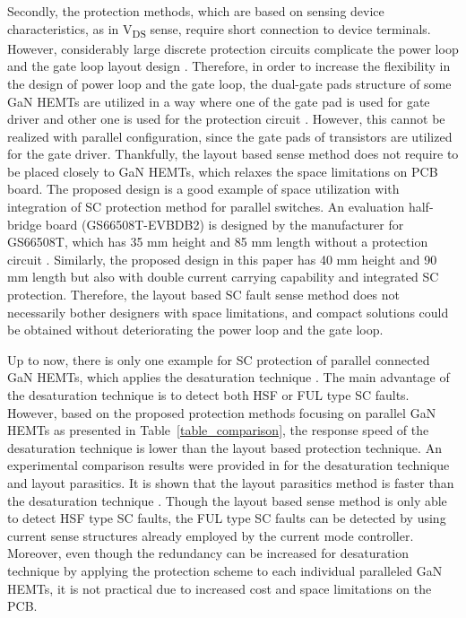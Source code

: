 \documentclass[journal]{IEEEtran}
\begin{document}
Secondly, the protection methods, which are based on sensing device characteristics, as in V\textsubscript{DS} sense, require short connection to device terminals. However, considerably large discrete protection circuits complicate the power loop and the gate loop layout design \cite{Hou2019}. Therefore, in order to increase the flexibility in the design of power loop and the gate loop, the dual-gate pads structure of some GaN HEMTs are utilized in a way where one of the gate pad is used for gate driver and other one is used for the protection circuit \cite{Hou2019}. However, this cannot be realized with parallel configuration, since the gate pads of transistors are utilized for the gate driver. Thankfully, the layout based sense method does not require to be placed closely to GaN HEMTs, which relaxes the space limitations on PCB board. The proposed design is a good example of space utilization with integration of SC protection method for parallel switches. An evaluation half-bridge board (GS66508T-EVBDB2) is designed by the manufacturer for GS66508T, which has 35 mm height and 85 mm length without a protection circuit \cite{GaNSystemsInc.2020}. Similarly, the proposed design in this paper has 40 mm height and 90 mm length but also with double current carrying capability and integrated SC protection. Therefore, the layout based SC fault sense method does not necessarily bother designers with space limitations, and compact solutions could be obtained without deteriorating the power loop and the gate loop.

Up to now, there is only one example for SC protection of parallel connected GaN HEMTs, which applies the desaturation technique \cite{Gui2018}. The main advantage of the desaturation technique is to detect both HSF or FUL type SC faults. However, based on the proposed protection methods focusing on parallel GaN HEMTs as presented in Table~\ref{table_comparison}, the response speed of the desaturation technique is lower than the layout based protection technique. An experimental comparison results were provided in \cite{Awwad} for the desaturation technique and layout parasitics. It is shown that the layout parasitics method is faster than the desaturation technique \cite{Awwad}. Though the layout based sense method is only able to detect HSF type SC faults, the FUL type SC faults can be detected by using current sense structures already employed by the current mode controller. Moreover, even though the redundancy can be increased for desaturation technique by applying the protection scheme to each individual paralleled GaN HEMTs, it is not practical due to increased cost and space limitations on the PCB.
\end{document}
